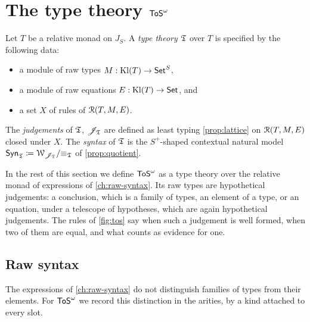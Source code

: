 \section{The type theory \texorpdfstring{$\mathsf{ToS}^\omega$}{ToS-omega}}
\label{sec:type-theories}

\begin{definition}\label{def:type-theory}
    Let $T$ be a relative monad on $J_S$. A \emph{type theory} $\mathfrak{T}$ over $T$ is specified by the following data:
    \begin{itemize}
        \item a module of raw types $M : \mathrm{Kl}(T) \to \mathsf{Set}^S$,
        \item a module of raw equations $E : \mathrm{Kl}(T) \to \mathsf{Set}$, and
        \item a set $X$ of rules of $\mathcal{R}(T, M, E)$.
    \end{itemize}
    The \emph{judgements} of $\mathfrak{T}$, $\mathscr{J}_{\mathfrak{T}}$ are defined as least typing \cref{prop:lattice} on $\mathcal{R}(T, M, E)$ closed under $X$.
    The \emph{syntax} of $\mathfrak{T}$ is the $S^+$-shaped contextual natural model $\mathsf{Syn}_{\mathfrak{T}} \coloneqq \mathcal{W}_{\mathscr{J}_{\mathfrak{T}}}/{\equiv_{\mathfrak{T}}}$ of \cref{prop:quotient}.
\end{definition}

In the rest of this section we define $\mathsf{ToS}^\omega$ as a type theory over the relative monad of expressions of \cref{ch:raw-syntax}. Its raw types are hypothetical judgements: a conclusion, which is a family of types, an element of a type, or an equation, under a telescope of hypotheses, which are again hypothetical judgements. The rules of \cref{fig:tos} say when such a judgement is well formed, when two of them are equal, and what counts as evidence for one.

\subsection{Raw syntax}
\label{sec:tos-raw}
\providecommand{\Tel}{\mathsf{Tel}}

The expressions of \cref{ch:raw-syntax} do not distinguish families of types from their elements. For $\mathsf{ToS}^\omega$ we record this distinction in the arities, by a kind attached to every slot.

